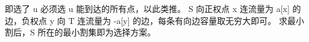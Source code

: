 {}即选了 \markdownRendererDollarSign{}u\markdownRendererDollarSign{} 必须选 \markdownRendererDollarSign{}u\markdownRendererDollarSign{} 能到达的所有点，以此类推。\markdownRendererHardLineBreak
{}\markdownRendererDollarSign{}S\markdownRendererDollarSign{} 向正权点 \markdownRendererDollarSign{}x\markdownRendererDollarSign{} 连流量为 \markdownRendererDollarSign{}a[x]\markdownRendererDollarSign{} 的边，负权点 \markdownRendererDollarSign{}y\markdownRendererDollarSign{} 向 \markdownRendererDollarSign{}T\markdownRendererDollarSign{} 连流量为 \markdownRendererDollarSign{}-a[y]\markdownRendererDollarSign{} 的边，每条有向边容量取无穷大即可。\markdownRendererHardLineBreak
{}求最小割后，\markdownRendererDollarSign{}S\markdownRendererDollarSign{} 所在的最小割集即为选择方案。\markdownRendererInterblockSeparator
{}
\markdownRendererSectionEnd \markdownRendererSectionBegin
{}\markdownRendererInterblockSeparator

